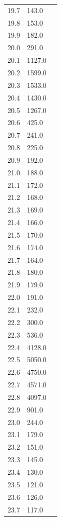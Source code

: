 \begin{minipage}{\linewidth}
\begin{table}[H]
\begin{tabular}{lll}
        19.7	& 143.0 \\
        19.8	& 153.0 \\
        19.9	& 182.0 \\
        20.0	& 291.0 \\
        20.1	& 1127.0 \\
        20.2	& 1599.0 \\
        20.3	& 1533.0 \\
        20.4	& 1430.0 \\
        20.5	& 1267.0 \\
        20.6	& 425.0 \\
        20.7	& 241.0 \\
        20.8	& 225.0 \\
        20.9	& 192.0 \\
        21.0	& 188.0 \\
        21.1	& 172.0 \\
        21.2	& 168.0 \\
        21.3	& 169.0 \\
        21.4	& 166.0 \\
        21.5	& 170.0 \\
        21.6	& 174.0 \\
        21.7	& 164.0 \\
        21.8	& 180.0 \\
        21.9	& 179.0 \\
        22.0	& 191.0 \\
        22.1	& 232.0 \\
        22.2	& 300.0 \\
        22.3	& 536.0 \\
        22.4	& 4128.0 \\
        22.5	& 5050.0 \\ 
        22.6	& 4750.0 \\
        22.7	& 4571.0 \\
        22.8	& 4097.0 \\
        22.9	& 901.0 \\
        23.0	& 244.0 \\
        23.1	& 179.0 \\
        23.2	& 151.0 \\
        23.3	& 145.0 \\
        23.4	& 130.0 \\
        23.5	& 121.0 \\
        23.6	& 126.0 \\
        23.7	& 117.0 \\

\end{tabular}
\end{table}
\end{minipage}
